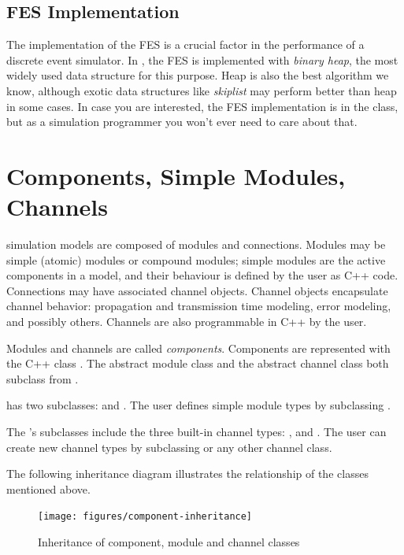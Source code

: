 \subsection{FES Implementation}
\label{sec:simple-modules:fes-implementation}

The implementation of the FES is a crucial factor in the
performance of a discrete event simulator. In {\opp}, the FES is
implemented with \textit{binary heap}, the most
widely used data structure for this purpose. Heap is also the best
algorithm we know, although exotic data structures like
\textit{skiplist} may perform better than heap in some
cases. In case you are interested, the FES implementation is in the
 class, but as a simulation programmer you won't
ever need to care about that.


\section{Components, Simple Modules, Channels}
\label{sec:simple-modules-in-opp}

{\opp} simulation models are composed of modules and connections. Modules
may be simple (atomic) modules or compound modules; simple modules are the
active components in a model, and their behaviour is defined by the user as
C++ code. Connections may have associated channel objects. Channel objects
encapsulate channel behavior: propagation and transmission time modeling,
error modeling, and possibly others. Channels are also programmable in C++
by the user.

Modules and channels are called \textit{components}. Components are
represented with the C++ class . The abstract module
class  and the abstract channel class 
both subclass from .

 has two subclasses:  and
. The user defines simple module types by
subclassing .

The 's subclasses include the three built-in channel
types: ,  and
. The user can create new channel types
by subclassing  or any other channel class.

The following inheritance diagram illustrates the relationship
of the classes mentioned above.

\begin{figure}[htbp]
  \begin{center}
    \texttt{[image: figures/component-inheritance]}
    \caption{Inheritance of component, module and channel classes}
  \end{center}
\end{figure}

